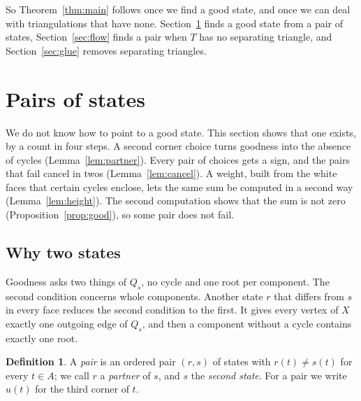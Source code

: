 \documentclass[10pt]{amsart}
\numberwithin{equation}{section}
\theoremstyle{definition}
\newtheorem{definition}[equation]{Definition}
\theoremstyle{remark}
\newcommand{\T}{T}
\begin{document}
So Theorem~\ref{thm:main} follows once we find a good state, and once we can deal with triangulations that have none.
Section~\ref{sec:pairs} finds a good state from a pair of states, Section~\ref{sec:flow} finds a pair when $\T$ has no separating triangle, and Section~\ref{sec:glue} removes separating triangles.

\section{Pairs of states}\label{sec:pairs}

We do not know how to point to a good state.
This section shows that one exists, by a count in four steps.
A second corner choice turns goodness into the absence of cycles (Lemma~\ref{lem:partner}).
Every pair of choices gets a sign, and the pairs that fail cancel in twos (Lemma~\ref{lem:cancel}).
A weight, built from the white faces that certain cycles enclose, lets the same sum be computed in a second way (Lemma~\ref{lem:height}).
The second computation shows that the sum is not zero (Proposition~\ref{prop:good}), so some pair does not fail.

\subsection*{Why two states}
Goodness asks two things of $Q_s$, no cycle and one root per component.
The second condition concerns whole components.
Another state $r$ that differs from $s$ in every face reduces the second condition to the first.
It gives every vertex of $X$ exactly one outgoing edge of $Q_s$, and then a component without a cycle contains exactly one root.

\begin{definition}
A \emph{pair} is an ordered pair $(r,s)$ of states with $r(t)\neq s(t)$ for every $t\in A$; we call $r$ a \emph{partner} of $s$, and $s$ the \emph{second state}.
For a pair we write $u(t)$ for the third corner of $t$.
\end{definition}
\end{document}
